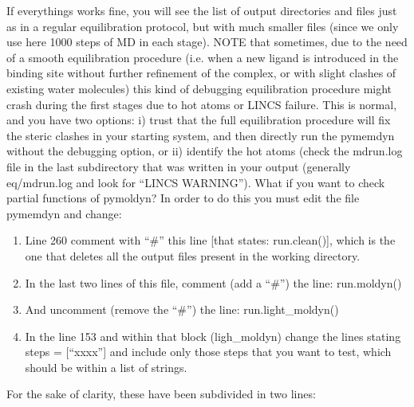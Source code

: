 \documentclass[letterpaper,10pt,english]{sphinxmanual}
\begin{document}
\sphinxAtStartPar
If everythings works fine, you will see the list of output directories
and files just as in a regular equilibration protocol, but with much
smaller files (since we only use here 1000 steps of MD in each stage).
NOTE that sometimes, due to the need of a smooth equilibration procedure
(i.e. when a new ligand is introduced in the binding site without
further refinement of the complex, or with slight clashes of existing
water molecules) this kind of debugging equilibration procedure might
crash during the first stages due to hot atoms or LINCS failure. This is
normal, and you have two options: i) trust that the full equilibration
procedure will fix the steric clashes in your starting system, and then
directly run the pymemdyn without the debugging option, or ii) identify
the hot atoms (check the mdrun.log file in the last subdirectory that
was written in your output (generally eq/mdrun.log and look for “LINCS
WARNING”). What if you want to check partial functions of pymoldyn? In
order to do this you must edit the file pymemdyn and change:
\begin{enumerate}
%
\item {} 
\sphinxAtStartPar
Line 260 comment with “\#” this line {[}that states: run.clean(){]}, which
is the one that deletes all the output files present in the working
directory.

\item {} 
\sphinxAtStartPar
In the last two lines of this file, comment (add a “\#”) the line:
run.moldyn()

\item {} 
\sphinxAtStartPar
And uncomment (remove the “\#”) the line: run.light\_moldyn()

\item {} 
\sphinxAtStartPar
In the line 153 and within that block (ligh\_moldyn) change the lines
stating steps = {[}“xxxx”{]} and include only those steps that you want
to test, which should be within a list of strings.

\end{enumerate}

\sphinxAtStartPar
For the sake of clarity, these have been subdivided in two lines:

\begin{sphinxVerbatim}[commandchars=\\\{\}]
     \PYG{p}{[}    \PYG{p}{]}
\end{sphinxVerbatim}
\end{document}
